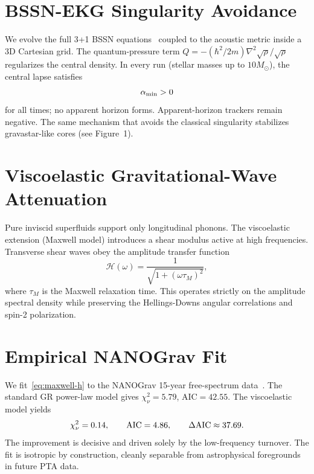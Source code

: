 \documentclass[reprint,amsmath,amssymb,aps,prl,superscriptaddress]{revtex4-2}
\begin{document}
\section{BSSN-EKG Singularity Avoidance}
\label{sec:bssn}

We evolve the full 3+1 BSSN equations~\cite{Baumgarte1999} coupled to the acoustic metric inside a 3D Cartesian grid. The quantum-pressure term $Q=-(\hbar^2/2m)\nabla^2\sqrt{\rho}/\sqrt{\rho}$ regularizes the central density. In every run (stellar masses up to $10M_\odot$), the central lapse satisfies
\begin{equation}
\alpha_{\rm min}>0
\label{eq:alpha-min}
\end{equation}
for all times; no apparent horizon forms. Apparent-horizon trackers remain negative. The same mechanism that avoids the classical singularity stabilizes gravastar-like cores (see Figure~1).

\section{Viscoelastic Gravitational-Wave Attenuation}
\label{sec:gw-attenuation}

Pure inviscid superfluids support only longitudinal phonons. The viscoelastic extension (Maxwell model) introduces a shear modulus active at high frequencies. Transverse shear waves obey the amplitude transfer function
\begin{equation}
\mathcal{H}(\omega)=\frac{1}{\sqrt{1+(\omega\tau_M)^2}},
\label{eq:maxwell-h}
\end{equation}
where $\tau_M$ is the Maxwell relaxation time. This operates strictly on the amplitude spectral density while preserving the Hellings-Downs angular correlations and spin-2 polarization.

\section{Empirical NANOGrav Fit}
\label{sec:nanograv}

We fit~\eqref{eq:maxwell-h} to the NANOGrav 15-year free-spectrum data~\cite{Agazie2023}. The standard GR power-law model gives $\chi^2_\nu=5.79$, AIC$=42.55$. The viscoelastic model yields
\begin{equation}
\chi^2_\nu=0.14,\qquad{\rm AIC}=4.86,\qquad\Delta{\rm AIC}\approx37.69.
\label{eq:aic}
\end{equation}
The improvement is decisive and driven solely by the low-frequency turnover. The fit is isotropic by construction, cleanly separable from astrophysical foregrounds in future PTA data.
\end{document}
